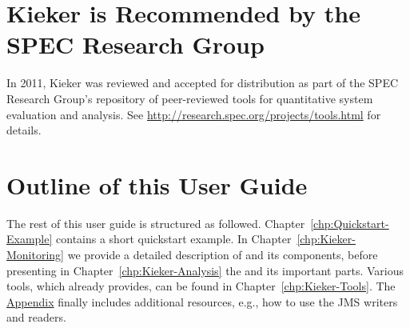	\section{Kieker is Recommended by the SPEC Research Group}
		In 2011, Kieker was reviewed and accepted for distribution as part of the SPEC Research Group's repository of peer-reviewed tools for quantitative system evaluation and analysis. See \url{http://research.spec.org/projects/tools.html} for details.	
		
	\section{Outline of this User Guide}
		The rest of this user guide is structured as followed. Chapter~\ref{chp:Quickstart-Example} contains a short quickstart example. In Chapter~\ref{chp:Kieker-Monitoring} we provide a detailed description of \KiekerMonitoringPart{} and its components, before presenting in Chapter~\ref{chp:Kieker-Analysis} the \KiekerAnalysisPart{} and its important parts. Various tools, which \Kieker{} already provides, can be found in Chapter~\ref{chp:Kieker-Tools}. The \hyperlink{hypertarget:appendix}{Appendix} finally includes additional resources, e.g., how to use the JMS writers and readers.
